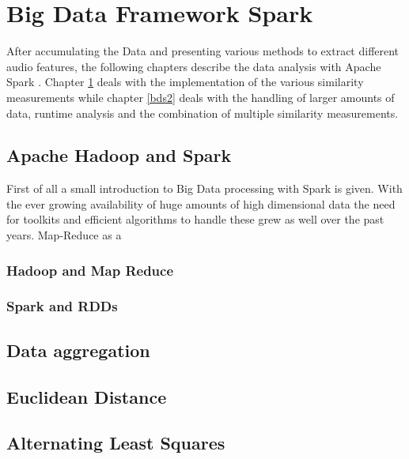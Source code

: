 
\chapter{Big Data Framework Spark}\label{bds1}

After accumulating the Data and presenting various methods to extract different audio features, the following chapters describe the data analysis with Apache Spark \cite{spark}. Chapter \ref{bds1} deals with the implementation of the various similarity measurements while chapter \ref{bds2} deals with the handling of larger amounts of data, runtime analysis and the combination of multiple similarity measurements. 

\section{Apache Hadoop and Spark} 

First of all a small introduction to Big Data processing with Spark is given.
With the ever growing availability of huge amounts of high dimensional data the need for toolkits and efficient algorithms to handle these grew as well over the past years. Map-Reduce as a 

\subsection{Hadoop and Map Reduce}



\subsection{Spark and RDDs}

\section{Data aggregation}



\section{Euclidean Distance}

\section{Alternating Least Squares}

